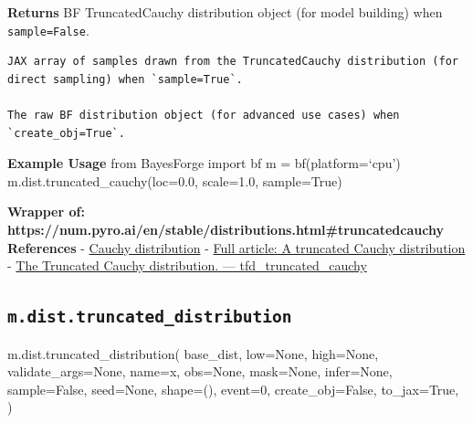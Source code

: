\documentclass[
  letterpaper,
  DIV=11,
  numbers=noendperiod]{scrartcl}
\newenvironment{Shaded}{\begin{snugshade}}{\end{snugshade}}
\newcommand{\DecValTok}[1]{\textcolor[rgb]{0.68,0.00,0.00}{#1}}
\newcommand{\NormalTok}[1]{\textcolor[rgb]{0.00,0.23,0.31}{#1}}
\newcommand{\OperatorTok}[1]{\textcolor[rgb]{0.37,0.37,0.37}{#1}}
\newcommand{\StringTok}[1]{\textcolor[rgb]{0.13,0.47,0.30}{#1}}
\newcommand{\VariableTok}[1]{\textcolor[rgb]{0.07,0.07,0.07}{#1}}
\begin{document}
\textbf{Returns} BF TruncatedCauchy distribution object (for model
building) when \texttt{sample=False}.

\begin{verbatim}
JAX array of samples drawn from the TruncatedCauchy distribution (for direct sampling) when `sample=True`.

The raw BF distribution object (for advanced use cases) when `create_obj=True`.
\end{verbatim}

\textbf{Example Usage} from BayesForge import bf m = bf(platform=`cpu')
m.dist.truncated\_cauchy(loc=0.0, scale=1.0, sample=True)

\textbf{Wrapper of:
https://num.pyro.ai/en/stable/distributions.html\#truncatedcauchy}
\textbf{References} -
\href{https://en.wikipedia.org/wiki/Cauchy_distribution}{Cauchy
distribution} -
\href{https://www.tandfonline.com/doi/full/10.1080/00207390600595223}{Full
article: A truncated Cauchy distribution} -
\href{https://rstudio.github.io/tfprobability/reference/tfd_truncated_cauchy.html}{The
Truncated Cauchy distribution. --- tfd\_truncated\_cauchy}

\subsection{\texorpdfstring{\texttt{m.dist.truncated\_distribution}}{m.dist.truncated\_distribution}}\label{truncated_distribution}

\begin{Shaded}
\begin{Highlighting}[]
\NormalTok{m.dist.truncated\_distribution(}
\NormalTok{    base\_dist,}
\NormalTok{    low}\OperatorTok{=}\VariableTok{None}\NormalTok{,}
\NormalTok{    high}\OperatorTok{=}\VariableTok{None}\NormalTok{,}
\NormalTok{    validate\_args}\OperatorTok{=}\VariableTok{None}\NormalTok{,}
\NormalTok{    name}\OperatorTok{=}\StringTok{\textquotesingle{}x\textquotesingle{}}\NormalTok{,}
\NormalTok{    obs}\OperatorTok{=}\VariableTok{None}\NormalTok{,}
\NormalTok{    mask}\OperatorTok{=}\VariableTok{None}\NormalTok{,}
\NormalTok{    infer}\OperatorTok{=}\VariableTok{None}\NormalTok{,}
\NormalTok{    sample}\OperatorTok{=}\VariableTok{False}\NormalTok{,}
\NormalTok{    seed}\OperatorTok{=}\VariableTok{None}\NormalTok{,}
\NormalTok{    shape}\OperatorTok{=}\NormalTok{(),}
\NormalTok{    event}\OperatorTok{=}\DecValTok{0}\NormalTok{,}
\NormalTok{    create\_obj}\OperatorTok{=}\VariableTok{False}\NormalTok{,}
\NormalTok{    to\_jax}\OperatorTok{=}\VariableTok{True}\NormalTok{,}
\NormalTok{)}
\end{Highlighting}
\end{Shaded}
\end{document}
